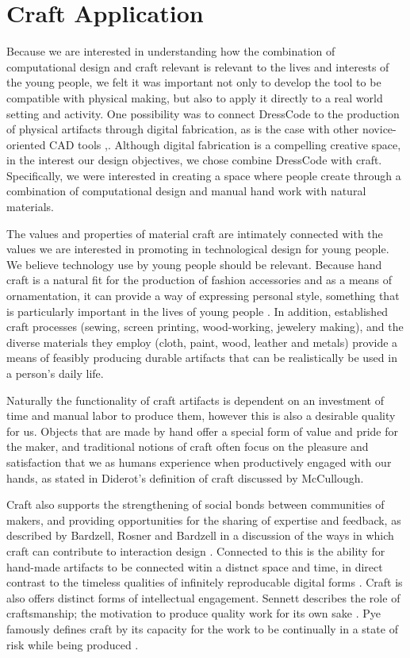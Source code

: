 \documentclass{sigchi}
\begin{document}
\section{Craft Application}
Because we are interested in understanding how the combination of computational design and craft relevant is relevant to the lives and interests of the young people, we felt it was important not only to develop the tool to be compatible with physical making, but also to apply it directly to a real world setting and activity. One possibility was to connect DressCode to the production of physical artifacts through digital fabrication, as is the case with other novice-oriented CAD tools \cite{tinkercad},\cite{123D}. Although digital fabrication is a compelling creative space, in the interest our design objectives, we chose combine DressCode with craft. Specifically, we were interested in creating a space where people create through a combination of computational design and manual hand work with natural materials. 

The values and properties of material craft are intimately connected with the values we are interested in promoting in technological design for young people. We believe technology use by young people should be relevant. Because hand craft is a natural fit for the production of fashion accessories and as a means of ornamentation, it can provide a way of expressing personal style, something that is particularly important in the lives of young people \cite{lilypad}. In addition, established craft processes (sewing, screen printing, wood-working, jewelery making), and the diverse materials they employ (cloth, paint, wood, leather and metals) provide a means of feasibly producing durable artifacts that can be realistically be used in a person's daily life. 

Naturally the functionality of craft artifacts is dependent on an investment of time and manual labor to produce them, however this is also a desirable quality for us. Objects that are made by hand offer a special form of value and pride for the maker, and traditional notions of craft often focus on the pleasure and satisfaction that we as humans experience when productively engaged with our hands, as stated in Diderot's definition of craft discussed by McCullough\cite{abstracting_craft}. 

Craft also supports the strengthening of social bonds between communities of makers, and providing opportunities for the sharing of expertise and feedback, as described by Bardzell, Rosner and Bardzell in a discussion of the ways in which craft can contribute to interaction design \cite{bardzell}. Connected to this is the ability for hand-made artifacts to be connected witin a distnct space and time, in direct contrast to the timeless qualities of infinitely reproducable digital forms \cite{zoran}. Craft is also offers distinct forms of intellectual engagement. Sennett describes the role of craftsmanship; the motivation to produce quality work for its own sake \cite{the_craftsman}. Pye famously defines craft by its capacity for the work to be continually in a state of risk while being produced 
\cite{pye}. 
\end{document}
